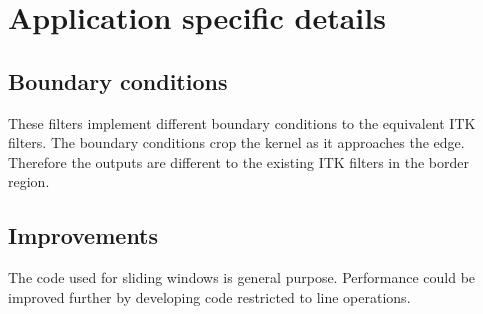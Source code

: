 \documentclass{InsightArticle}
\begin{document}
\section{Application specific details}
\subsection{Boundary conditions}
These filters implement different boundary conditions to the
equivalent ITK filters. The boundary conditions crop the kernel as it
approaches the edge. Therefore the outputs are different to the
existing ITK filters in the border region.

\subsection{Improvements}
The code used for sliding windows is general purpose. Performance
could be improved further by developing code restricted to line
operations.

\appendix





\nocite{ITKSoftwareGuide}
\end{document}
